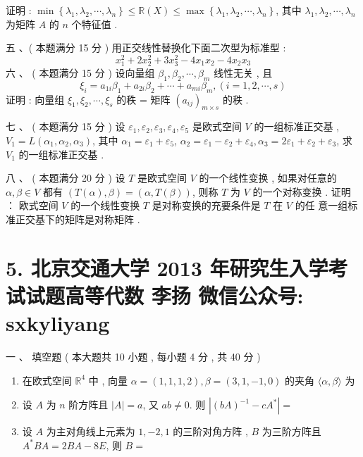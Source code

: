 \documentclass[10pt]{article}
\begin{document}
{ 证明 : $\min \left\{\lambda_{1}, \lambda_{2}, \cdots, \lambda_{n}\right\} \leqslant \mathbb{R}(X) \leqslant \max \left\{\lambda_{1}, \lambda_{2}, \cdots, \lambda_{n}\right\}$,  其中  $\lambda_{1}, \lambda_{2}, \cdots, \lambda_{n}$  为矩阵  $A$  的  $n$  个特征值 .

 五 、( 本题满分  15  分 )  用正交线性替换化下面二次型为标准型 :
$$
x_{1}^{2}+2 x_{2}^{2}+3 x_{3}^{2}-4 x_{1} x_{2}-4 x_{2} x_{3}
$$
 六 、 ( 本题满分  15  分 )  设向量组  $\beta_{1}, \beta_{2}, \cdots, \beta_{m}$  线性无关 ,  且 
$$
\xi_{i}=a_{1 i} \beta_{1}+a_{2 i} \beta_{2}+\cdots+a_{m i} \beta_{m},(i=1,2, \cdots, s)
$$
 证明 :  向量组  $\xi_{1}, \xi_{2}, \cdots, \xi_{s}$  的秩 = 矩阵  $\left(a_{i j}\right)_{m \times s}$  的秩 .

 七 、 ( 本题满分  15  分 )  设  $\varepsilon_{1}, \varepsilon_{2}, \varepsilon_{3}, \varepsilon_{4}, \varepsilon_{5}$  是欧式空间  $V$  的一组标准正交基 , $V_{1}=L\left(\alpha_{1}, \alpha_{2}, \alpha_{3}\right)$,  其中  $\alpha_{1}=\varepsilon_{1}+\varepsilon_{5}$, $\alpha_{2}=\varepsilon_{1}-\varepsilon_{2}+\varepsilon_{4}, \alpha_{3}=2 \varepsilon_{1}+\varepsilon_{2}+\varepsilon_{3}$,  求  $V_{1}$  的一组标准正交基 .

 八 、 ( 本题满分  20  分 )  设  $T$  是欧式空间  $V$  的一个线性变换 ,  如果对任意的  $\alpha, \beta \in V$  都有  $(T(\alpha), \beta)=(\alpha, T(\beta))$,  则称  $T$  为  $V$  的一个对称变换 .  证明 ： 欧式空间  $V$  的一个线性变换  $T$  是对称变换的充要条件是  $T$  在  $V$  的任   意一组标准正交基下的矩阵是对称矩阵 .

\section{5. 北京交通大学 2013 年研究生入学考试试题高等代数 
 李扬 
 微信公众号: sxkyliyang}
 一 、  填空题 ( 本大题共  10  小题 ,  每小题  4  分 ,  共  40  分 )

\begin{enumerate}
  \item  在欧式空间  $\mathbb{R}^{4}$  中 ,  向量  $\alpha=(1,1,1,2), \beta=(3,1,-1,0)$  的夹角  $\langle\alpha, \beta\rangle$  为 

  \item  设  $A$  为  $n$  阶方阵且  $|A|=a$,  又  $a b \neq 0$.  则  $\left|(b A)^{-1}-c A^{*}\right|=$

  \item  设  $A$  为主对角线上元素为  $1,-2,1$  的三阶对角方阵 , $B$  为三阶方阵且  $A^{*} B A=2 B A-8 E$,  则  $B=$


\end{enumerate}}
\end{document}
